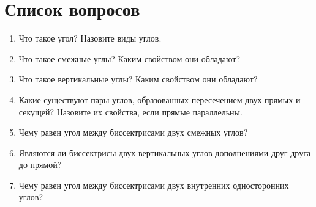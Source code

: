 \documentclass[12pt, a4paper]{article}
\begin{document}
		

\section{Список вопросов}
\begin{enumerate}
	\subsection{Углы}
	\item Что такое угол? Назовите виды углов.
	\item Что такое смежные углы? Каким свойством они обладают?
	\item Что такое вертикальные углы? Каким свойством они обладают?
	\item Какие существуют пары углов, образованных пересечением двух прямых и секущей? Назовите их свойства, если прямые параллельны.
	\item Чему равен угол между биссектрисами двух смежных углов?
	\item Являются ли биссектрисы двух вертикальных углов дополнениями друг друга до прямой?
	\item Чему равен угол между биссектрисами двух внутренних односторонних углов?

\end{enumerate}
\end{document}
